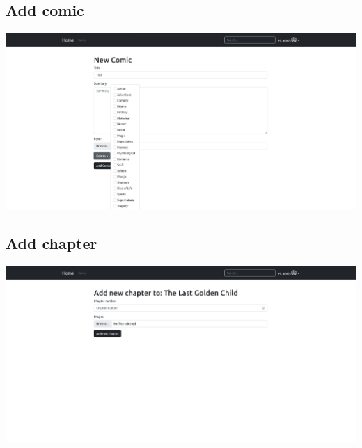 \subsection{Add comic}
\includegraphics[width=1.0\linewidth]{images/new-comic.png}

\subsection{Add chapter}
\includegraphics[width=1.0\linewidth]{images/new-chapter.png}
